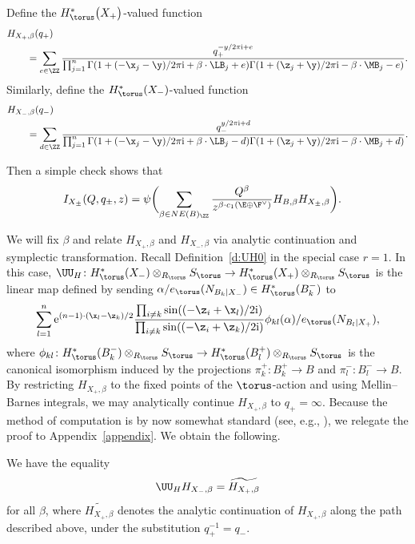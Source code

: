 Define the $H^*_\torus\bigl(X_+\bigr)$-valued function
\begin{align*}&H_{X_{+}, \beta}(q_+)\\ \nonumber
&\qquad{}= \sum_{e \in \ZZ} \frac{q_+^{-y/2 \pi {\rm i}+e}}
{\prod_{j=1}^n \Gamma(1 + (- \x_j - \y)/2 \pi {\rm i} + \beta \cdot \LB_j+e) \Gamma(1 + (\z_j + \y)/2 \pi {\rm i} - \beta \cdot \MB_j - e)}.\end{align*}
Similarly, define the $H^*_\torus(X_-)$-valued function
\begin{align}\label{e:HXm} &H_{X_-, \beta}(q_-) \\ \nonumber
& \qquad{}= \sum_{d \in \ZZ} \frac{q_-^{y/2 \pi {\rm i}+d}}
{\prod_{j=1}^n \Gamma(1 + (- \x_j - \y)/2 \pi {\rm i} + \beta \cdot \LB_j-d) \Gamma(1 + (\z_j + \y)/2 \pi {\rm i} - \beta \cdot \MB_j + d)}.\end{align}

Then a simple check shows that
\begin{align}\label{ItoH} I_{X_\pm}(Q, q_\pm, z) &{}= \psi \biggl( \sum_{\beta \in NE(B)_\ZZ} \frac{Q^\beta}{z^{\beta \cdot c_1(\E \oplus \F^\vee)}} H_{B, \beta} H_{X_\pm, \beta} \biggr).
\end{align}



We will fix $\beta$ and relate $H_{X_+, \beta}$ and $H_{X_-, \beta}$ via analytic continuation and symplectic transformation.
Recall Definition~\ref{d:UH0} in the special case $r=1$. In this case, $\UU_H\colon H^*_\torus(X_{-}) \otimes_{R_\torus} S_\torus \to H^*_\torus(X_{+})\otimes_{R_\torus} S_\torus$ is the linear map defined
by sending
$\alpha/e_\torus(N_{B_k|X_-}) \in H^*_\torus(B_k^{-})$ to
\begin{equation}\label{eU1}
\sum_{l = 1}^n {\rm e}^{ (n-1)\cdot ( \x_l-\z_k)/2 }\frac{ \prod_{i\neq k} \sin( (-\z_i+\x_l)/2 {\rm i}) }{\prod_{i \neq k}\sin((-\z_i + \z_k)/2 {\rm i})} \phi_{kl}(\alpha)/e_\torus(N_{B_l|X_+}),\end{equation}
where $\phi_{kl}\colon H^*_\torus(B_k^{-})\otimes_{R_\torus} S_\torus \to H^*_\torus(B_l^{+})\otimes_{R_\torus} S_\torus$ is the canonical isomorphism induced by the projections $\pi_k^{+}\colon B_k^{+} \to B$ and $\pi_l^{-}\colon B_l^{-} \to B$.
By restricting $H_{X_+, \beta}$ to the fixed points of the $\torus$-action and
using Mellin--Barnes integrals, we may analytically continue $H_{X_+, \beta}$ to $q_+ = \infty.$ Because the method of computation is by now somewhat standard (see, e.g., \cite{CIJ}), we relegate the proof to Appendix~\ref{appendix}.
We obtain the following.
\begin{Proposition}\label{p:ac1}
We have the equality
 \begin{equation}\label{analyticcomp}
\UU_H H_{X_{-}, \beta} = \widetilde{H_{X_{+}, \beta}}
\end{equation}
for all $\beta$, where $\widetilde{H_{X_{+}, \beta}}$ denotes the analytic continuation of $H_{X_{+}, \beta}$ along the path described above, under the substitution $q_+^{-1} = q_-$.
\end{Proposition}




